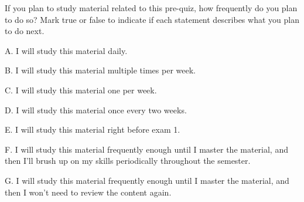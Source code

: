 \documentclass{ximera}
\begin{document}
\begin{problem}

If you plan to study material related to this pre-quiz, how frequently do you plan to do so?  Mark true or false to indicate if each statement describes what you plan to do next.

\vspace{1 in}

    A. I will study this material daily. 

    \begin{multipleChoice}
    \end{multipleChoice}
    
    B. I will study this material multiple times per week.
    
    \begin{multipleChoice}
    \end{multipleChoice}
    
    C. I will study this material one per week. 

    \begin{multipleChoice}
    \end{multipleChoice}
    
    D. I will study this material once every two weeks. 

    \begin{multipleChoice}
    \end{multipleChoice}
    
    E. I will study this material right before exam 1. 

    \begin{multipleChoice}
    \end{multipleChoice}
    
    F. I will study this material frequently enough until I master the material, and then I'll brush up on my skills periodically throughout the semester. 

    \begin{multipleChoice}
    \end{multipleChoice}
    
    G. I will study this material frequently enough until I master the material, and then I won't need to review the content again. 


\end{problem}
\end{document}
